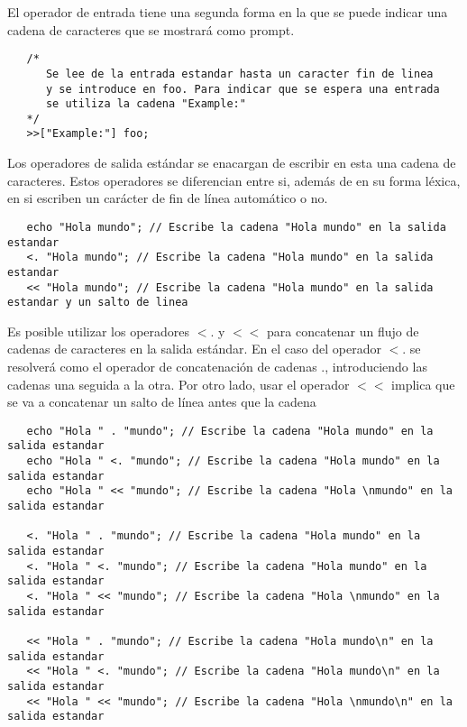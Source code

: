 El operador de entrada tiene una segunda forma en la que se puede indicar una cadena de caracteres
que se mostrará como prompt. \\

\begin{lstlisting}
   /*
      Se lee de la entrada estandar hasta un caracter fin de linea 
      y se introduce en foo. Para indicar que se espera una entrada
      se utiliza la cadena "Example:"
   */
   >>["Example:"] foo;
\end{lstlisting}

Los operadores de salida estándar se enacargan de escribir en esta una cadena de caracteres. 
Estos operadores se diferencian entre si, además de en su forma léxica, en si 
escriben un carácter de fin de línea automático o no. 
\\
\begin{lstlisting}
   echo "Hola mundo"; // Escribe la cadena "Hola mundo" en la salida estandar
   <. "Hola mundo"; // Escribe la cadena "Hola mundo" en la salida estandar
   << "Hola mundo"; // Escribe la cadena "Hola mundo" en la salida estandar y un salto de linea
\end{lstlisting}

Es posible utilizar los operadores $<.$ y $<<$ para concatenar un flujo de cadenas de caracteres en la
salida estándar. En el caso del operador $<.$ se resolverá como el operador de concatenación de cadenas 
$.$, introduciendo las cadenas una seguida a la otra. Por otro lado, usar el operador $<<$ implica que se
va a concatenar un salto de línea antes que la cadena\\

\begin{lstlisting}
   echo "Hola " . "mundo"; // Escribe la cadena "Hola mundo" en la salida estandar
   echo "Hola " <. "mundo"; // Escribe la cadena "Hola mundo" en la salida estandar
   echo "Hola " << "mundo"; // Escribe la cadena "Hola \nmundo" en la salida estandar
   
   <. "Hola " . "mundo"; // Escribe la cadena "Hola mundo" en la salida estandar
   <. "Hola " <. "mundo"; // Escribe la cadena "Hola mundo" en la salida estandar
   <. "Hola " << "mundo"; // Escribe la cadena "Hola \nmundo" en la salida estandar
   
   << "Hola " . "mundo"; // Escribe la cadena "Hola mundo\n" en la salida estandar
   << "Hola " <. "mundo"; // Escribe la cadena "Hola mundo\n" en la salida estandar
   << "Hola " << "mundo"; // Escribe la cadena "Hola \nmundo\n" en la salida estandar
\end{lstlisting}

